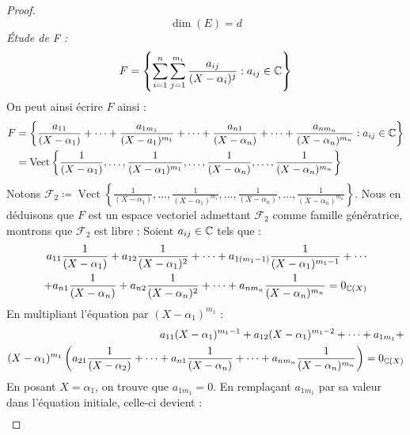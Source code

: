 \begin{proof}
    \[ \dim(E) = d \]
    \emph{\'Etude de F :}
    \[ F = \left\{ \sum_{i = 1}^{n} \sum_{j = 1}^{m_i} \frac{a_{ij}}{(X - \alpha_i)^{j}} : a_{ij} \in \mathbb{C} \right\} \]
    On peut ainsi écrire $F$ ainsi : 
    \begin{align*}
        F &= \left\{ \frac{a_{11}}{(X - \alpha_1)} + \cdots + \frac{a_{1m_1}}{(X - a_1)^{m_1}} + \cdots + \frac{a_{n1}}{(X - \alpha_n)} + \cdots + \frac{a_{nm_n}}{(X - \alpha_n)^{m_n}} : a_{ij} \in \mathbb{C} \right\} \\
        &= \operatorname{Vect} \left\{ \frac{1}{(X - \alpha_1)}, \ldots, \frac{1}{(X - \alpha_1)^{m_1}}, \ldots, \frac{1}{(X - \alpha_n)}, \ldots, \frac{1}{(X - \alpha_n)^{m_n}}  \right\}
    \end{align*}
    Notons $\mathcal{F}_2 \coloneqq \operatorname{Vect} \left\{ \frac{1}{(X - \alpha_1)}, \ldots, \frac{1}{(X - \alpha_1)^{m_1}}, \ldots, \frac{1}{(X - \alpha_n)}, \ldots, \frac{1}{(X - \alpha_n)^{m_n}}  \right\}$. Nous en déduisons que $F$ est un espace vectoriel admettant $\mathcal{F}_2$ comme famille génératrice, montrons que $\mathcal{F}_2$ est libre : Soient $a_{ij} \in \mathbb{C}$ tels que :
    \begin{align*}
        \begin{split}
            a_{11} \frac{1}{(X - \alpha_1)} + a_{12} \frac{1}{(X - \alpha_1)^2} + \cdots + a_{1(m_1 -1)} \frac{1}{(X - \alpha_1)^{m_1 - 1}} + \cdots \\
            + a_{n1} \frac{1}{(X - \alpha_n)} + a_{n2} \frac{1}{(X - \alpha_n)^2} + \cdots + a_{nm_n} \frac{1}{(X - \alpha_n)^{m_n}} = 0_{\mathbb{C}(X)}
        \end{split}
    \end{align*}
    En multipliant l'équation par $(X - \alpha_1)^{m_1}$ :
    \begin{align*}
        \begin{split}
            a_{11} (X - \alpha_1)^{m_1 - 1} + a_{12} (X - \alpha_1)^{m_1 - 2} + \cdots + a_{1m_1} + \\
            (X - \alpha_1)^{m_1}
            \left( 
            a_{21} \frac{1}{(X - \alpha_2)} + \cdots + a_{n1} \frac{1}{(X - \alpha_n)} + \cdots + a_{nm_n} \frac{1}{(X - \alpha_n)^{m_n}}
            \right)
            = 0_{\mathbb{C}(X)}
         \end{split}
    \end{align*}
    En posant $X = \alpha_1$, on trouve que $a_{1m_1} = 0$.
    En remplaçant $a_{1m_1}$ par sa valeur dans l'équation initiale, celle-ci devient : 
    \begin{align*}

\end{align*}
\end{proof}
